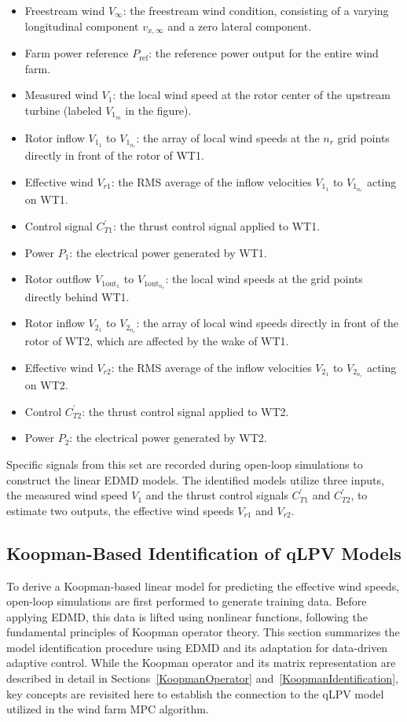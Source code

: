 \begin{itemize}
    \item Freestream wind $V_\infty$: the freestream wind condition, consisting of a varying longitudinal component $v_{x,\infty}$ and a zero lateral component.
    \item Farm power reference $P_{\text{ref}}$: the reference power output for the entire wind farm.
    \item Measured wind $V_1$: the local wind speed at the rotor center of the upstream turbine (labeled $V_{1_m}$ in the figure).
    \item Rotor inflow $V_{1_1}$ to $V_{1_{n_r}}$: the array of local wind speeds at the $n_r$ grid points directly in front of the rotor of WT1.
    \item Effective wind $V_{r1}$: the RMS average of the inflow velocities $V_{1_1}$ to $V_{1_{n_r}}$ acting on WT1.
    \item Control signal $C_{T1}^{\prime}$: the thrust control signal applied to WT1.
    \item Power $P_1$: the electrical power generated by WT1.
    \item Rotor outflow $V_{1\text{out}_1}$ to $V_{1\text{out}_{n_r}}$: the local wind speeds at the grid points directly behind WT1.
    \item Rotor inflow $V_{2_1}$ to $V_{2_{n_r}}$: the array of local wind speeds directly in front of the rotor of WT2, which are affected by the wake of WT1.
    \item Effective wind $V_{r2}$: the RMS average of the inflow velocities $V_{2_1}$ to $V_{2_{n_r}}$ acting on WT2.
    \item Control $C_{T2}^{\prime}$: the thrust control signal applied to WT2.
    \item Power $P_2$: the electrical power generated by WT2.
\end{itemize}
Specific signals from this set are recorded during open-loop simulations to construct the linear EDMD models. The identified models utilize three inputs, the measured wind speed $V_1$ and the thrust control signals $C_{T1}^{\prime}$ and $C_{T2}^{\prime}$, to estimate two outputs, the effective wind speeds $V_{r1}$ and $V_{r2}$.

\subsection{Koopman-Based Identification of qLPV Models}
To derive a Koopman-based linear model for predicting the effective wind speeds, open-loop simulations are first performed to generate training data. Before applying EDMD, this data is lifted using nonlinear functions, following the fundamental principles of Koopman operator theory. This section summarizes the model identification procedure using EDMD and its adaptation for data-driven adaptive control. While the Koopman operator and its matrix representation are described in detail in Sections~\ref{KoopmanOperator} and~\ref{KoopmanIdentification}, key concepts are revisited here to establish the connection to the qLPV model utilized in the wind farm MPC algorithm.

